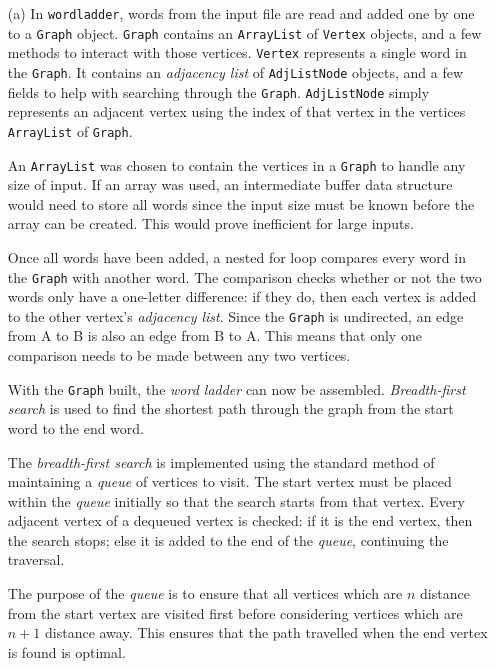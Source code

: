 \documentclass{article}
\begin{document}
\begin{itemize}
    \item[(a)]
    In \texttt{wordladder}, words from the input file are read and added one by one to a \texttt{Graph} object. \texttt{Graph} contains an \texttt{ArrayList} of \texttt{Vertex} objects, and a few methods to interact with those vertices. \texttt{Vertex} represents a single word in the \texttt{Graph}. It contains an \textit{adjacency list} of \texttt{AdjListNode} objects, and a few fields to help with searching through the \texttt{Graph}. \texttt{AdjListNode} simply represents an adjacent vertex using the index of that vertex in the vertices \texttt{ArrayList} of \texttt{Graph}.

    An \texttt{ArrayList} was chosen to contain the vertices in a \texttt{Graph} to handle any size of input. If an array was used, an intermediate buffer data structure would need to store all words since the input size must be known before the array can be created. This would prove inefficient for large inputs.

    Once all words have been added, a nested for loop compares every word in the \texttt{Graph} with another word. The comparison checks whether or not the two words only have a one-letter difference: if they do, then each vertex is added to the other vertex's \textit{adjacency list}. Since the \texttt{Graph} is undirected, an edge from A to B is also an edge from B to A. This means that only one comparison needs to be made between any two vertices.

    With the \texttt{Graph} built, the \textit{word ladder} can now be assembled. \textit{Breadth-first search} is used to find the shortest path through the graph from the start word to the end word.

    The \textit{breadth-first search} is implemented using the standard method of maintaining a \textit{queue} of vertices to visit. The start vertex must be placed within the \textit{queue} initially so that the search starts from that vertex. Every adjacent vertex of a dequeued vertex is checked: if it is the end vertex, then the search stops; else it is added to the end of the \textit{queue}, continuing the traversal.

    The purpose of the \textit{queue} is to ensure that all vertices which are $n$ distance from the start vertex are visited first before considering vertices which are $n + 1$ distance away. This ensures that the path travelled when the end vertex is found is optimal.


\end{itemize}
\end{document}
